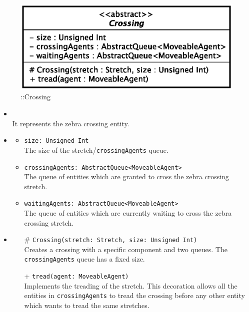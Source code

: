 \begin{figure}[h]
\centering
\includegraphics[scale=0.6,keepaspectratio]{images/solution/app/backend/crossing.eps}
\caption{\pReactiveComponentStretchDecoration::Crossing}
\label{fig:sd-app-crossing}
\end{figure}
\FloatBarrier
\begin{itemize}
  \item \textbf{\descr} \\
    It represents the zebra crossing entity. 
  \item \textbf{\attrs}
  \begin{itemize}
    \item \texttt{size: Unsigned Int} \\
The size of the stretch/\texttt{crossingAgents} queue.
    \item \texttt{crossingAgents: AbstractQueue<MoveableAgent>} \\
The queue of entities which are granted to cross the zebra crossing stretch.
  \item \texttt{waitingAgents: AbstractQueue<MoveableAgent>} \\
The queue of entities which are currently waiting to cross the zebra crossing stretch.
  \end{itemize}
\item \textbf{\ops}
  \begin{itemize}
    \item[\#] \texttt{Crossing(stretch: Stretch, size: Unsigned Int)} \\
Creates a crossing with a specific component and two queues. The
\texttt{crossingAgents} queue has a fixed size.
    \item[+] \texttt{tread(agent: MoveableAgent)} \\
Implements the treading of the stretch. This decoration allows all the
entities in \texttt{crossingAgents} to tread the crossing before any other entity
which wants to tread the same stretches.
  \end{itemize}
\end{itemize}
